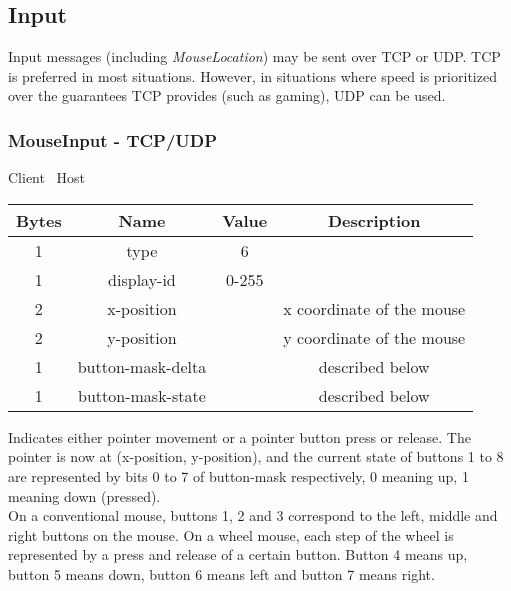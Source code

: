 \subsection{Input}

Input messages (including \emph{MouseLocation}) may be sent over TCP or UDP. TCP is preferred in most situations.
However, in situations where speed is prioritized over the guarantees TCP provides (such as gaming), UDP can be
used.

\subsubsection{MouseInput - TCP/UDP}

\begin{center}
    Client \textrightarrow\ Host\\
    \begin{tabular}{|c|c|c|c|}
        \hline
        \textbf{Bytes} & \textbf{Name} & \textbf{Value} & \textbf{Description}      \\
        \hline
        1              & type          & 6              &                           \\
        \hline
        1              & display-id    & 0-255          &                           \\
        \hline
        2              & x-position    &                & x coordinate of the mouse \\
        \hline
        2              & y-position    &                & y coordinate of the mouse \\
        \hline
        1              & button-mask-delta   &                & described below           \\
        \hline
        1              & button-mask-state   &                & described below           \\
        \hline
    \end{tabular}
\end{center}

Indicates either pointer movement or a pointer button press or release. The pointer is now at (x-position,
y-position), and the current state of buttons 1 to 8 are represented by bits 0 to 7 of button-mask respectively,
0 meaning up, 1 meaning down (pressed).\\

On a conventional mouse, buttons 1, 2 and 3 correspond to the left, middle and right buttons on the mouse. On a
wheel mouse, each step of the wheel is represented by a press and release of a certain button. Button 4 means up,
button 5 means down, button 6 means left and button 7 means right.\\

